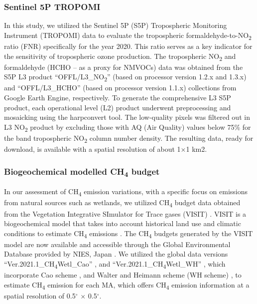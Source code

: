 \subsubsection*{Sentinel 5P TROPOMI}
In this study, we utilized the Sentinel 5P (S5P) Tropospheric Monitoring Instrument (TROPOMI) data to evaluate the tropospheric formaldehyde-to-NO\textsubscript{2} ratio (FNR) specifically for the year 2020. This ratio serves as a key indicator for the sensitivity of tropospheric ozone production. The tropospheric NO\textsubscript{2} and formaldehyde (HCHO – as a proxy for NMVOCs) data was obtained from the S5P L3 product \enquote{OFFL\slash L3\_NO\textsubscript{2}} (based on processor version 1.2.x and 1.3.x) and \enquote{OFFL\slash L3\_HCHO} (based on processor version 1.1.x) collections from Google Earth Engine, respectively. To generate the comprehensive L3 S5P product, each operational level (L2) product underwent preprocessing and mosaicking using the harpconvert tool. The low-quality pixels was filtered out in L3 NO\textsubscript{2} product by excluding those with AQ (Air Quality) values below 75\% for the band tropospheric NO\textsubscript{2} column number density. The resulting data, ready for download, is available with a spatial resolution of about 1$\times$1 km2.
\subsubsection*{Biogeochemical modelled CH\textsubscript{4} budget}
In our assessment of CH\textsubscript{4} emission variations, with a specific focus on emissions from natural sources such as wetlands, we utilized CH\textsubscript{4} budget data obtained from the Vegetation Integrative SImulator for Trace gases (VISIT) \citep{ito2019methane}. VISIT is a biogeochemical model that takes into account historical land use and climatic conditions to estimate CH\textsubscript{4} emissions \citep{ito2019methane}. The CH\textsubscript{4} budgets generated by the VISIT model are now available and accessible through the Global Environmental Database provided by NIES, Japan \citep{ito2019methane}. We utilized the global data versions \enquote{Ver.2021.1\_CH\textsubscript{4}Wetl\_Cao} \citep{ito2021cao}, and \enquote{Ver.2021.1\_CH\textsubscript{4}Wetl\_WH} \citep{ito2021wh}, which incorporate Cao scheme \citep{cao1996global}, and Walter and Heimann scheme (WH scheme) \citep{walter2000process}, to estimate CH\textsubscript{4} emission for each MA, which offers CH\textsubscript{4} emission information at a spatial resolution of 0.5$^{\circ}$ $\times$ 0.5$^{\circ}$. \par
